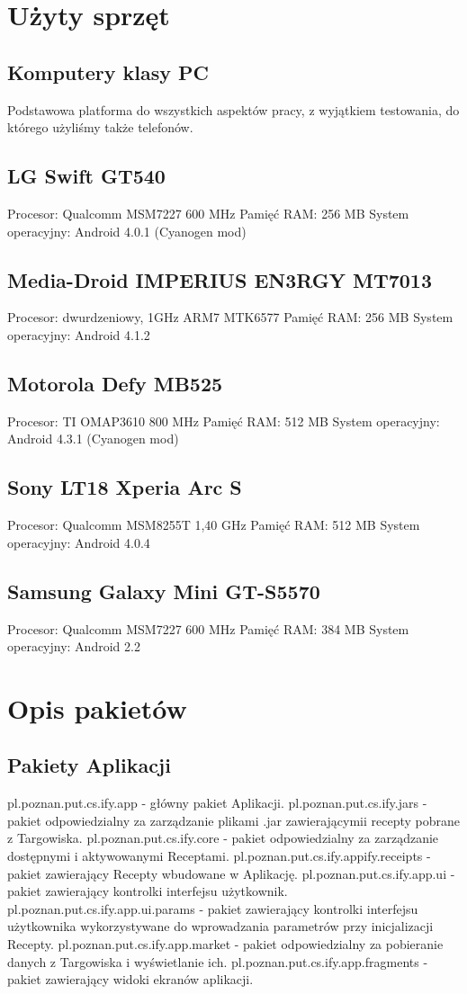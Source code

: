 \documentclass[11pt,a4paper,polish,thesis]{dcsbook}
\begin{document}
\section{Użyty sprzęt}
\subsection{Komputery klasy PC}
Podstawowa platforma do wszystkich aspektów pracy, z wyjątkiem testowania, do którego użyliśmy także telefonów.
\subsection{LG Swift GT540}
Procesor: Qualcomm MSM7227 600 MHz
Pamięć RAM: 256 MB
System operacyjny: Android 4.0.1 (Cyanogen mod)
\subsection{Media-Droid IMPERIUS EN3RGY MT7013}
Procesor: dwurdzeniowy, 1GHz ARM7 MTK6577
Pamięć RAM: 256 MB
System operacyjny: Android 4.1.2
\subsection{Motorola Defy MB525}
Procesor: TI OMAP3610 800 MHz
Pamięć RAM: 512 MB
System operacyjny: Android 4.3.1 (Cyanogen mod)
\subsection{Sony LT18 Xperia Arc S}
Procesor: Qualcomm MSM8255T 1,40 GHz
Pamięć RAM: 512 MB
System operacyjny: Android 4.0.4
\subsection{Samsung Galaxy Mini GT-S5570}
Procesor: Qualcomm MSM7227 600 MHz
Pamięć RAM: 384 MB
System operacyjny: Android 2.2

\section{Opis pakietów}
\subsection{Pakiety Aplikacji}
pl.poznan.put.cs.ify.app - główny pakiet Aplikacji.
pl.poznan.put.cs.ify.jars - pakiet odpowiedzialny za zarządzanie plikami .jar zawierającymii recepty pobrane z Targowiska.
pl.poznan.put.cs.ify.core - pakiet odpowiedzialny za zarządzanie dostępnymi i aktywowanymi Receptami.
pl.poznan.put.cs.ify.appify.receipts - pakiet zawierający Recepty wbudowane w Aplikację.
pl.poznan.put.cs.ify.app.ui - pakiet zawierający kontrolki interfejsu użytkownik.
pl.poznan.put.cs.ify.app.ui.params - pakiet zawierający kontrolki interfejsu użytkownika wykorzystywane do wprowadzania parametrów przy inicjalizacji Recepty.
pl.poznan.put.cs.ify.app.market - pakiet odpowiedzialny za pobieranie danych z Targowiska i wyświetlanie ich.
pl.poznan.put.cs.ify.app.fragments - pakiet zawierający widoki ekranów aplikacji.
\end{document}
